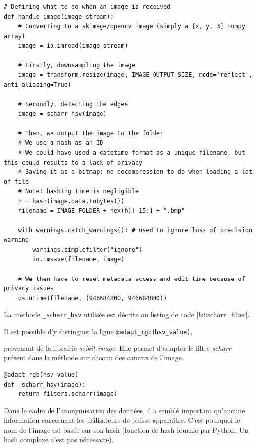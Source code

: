 \begin{lstlisting}[caption={Traitement des images reçues}, label={lst:handling_image}] 
# Defining what to do when an image is received
def handle_image(image_stream):
    # Converting to a skimage/opencv image (simply a [x, y, 3] numpy array)
    image = io.imread(image_stream)

    # Firstly, downsampling the image
    image = transform.resize(image, IMAGE_OUTPUT_SIZE, mode='reflect', anti_aliasing=True)

    # Secondly, detecting the edges
    image = scharr_hsv(image)

    # Then, we output the image to the folder
    # We use a hash as an ID
    # We could have used a datetime format as a unique filename, but this could results to a lack of privacy
    # Saving it as a bitmap: no decompression to do when loading a lot of file
    # Note: hashing time is negligible
    h = hash(image.data.tobytes())
    filename = IMAGE_FOLDER + hex(h)[-15:] + ".bmp"

    with warnings.catch_warnings(): # used to ignore loss of precision warning
        warnings.simplefilter("ignore")
        io.imsave(filename, image)

    # We then have to reset metadata access and edit time because of privacy issues
    os.utime(filename, (946684800, 946684800))
\end{lstlisting}

La méthode \lstinline[columns=fixed]{_scharr_hsv} utilisée est décrite au listing de code \ref{lst:scharr_filter}. 

Il est possible d'y distinguer la ligne \lstinline[columns=fixed]{@adapt_rgb(hsv_value)}, 

provenant de la librairie \textit{scikit-image}. Elle permet d'adapter le filtre \textit{scharr} présent dans la méthode sur chacun des canaux de l'image.

\begin{lstlisting}[caption={Détection de bord à l'aide de \textit{scikit-image}}, label={lst:scharr_filter}] 
@adapt_rgb(hsv_value)
def _scharr_hsv(image):
    return filters.scharr(image)
\end{lstlisting}

Dans le cadre de l'anonymisation des données, il a semblé important qu'aucune information concernant les utilisateurs de puisse apparaître. C'est pourquoi le nom de l'image est basée sur son hash (fonction de hash fournie par Python. Un hash complexe n'est pas nécessaire). 

